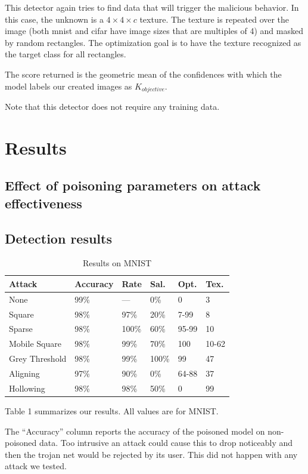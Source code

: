 \documentclass[letterpaper, 10 pt, conference]{ieeeconf}  %
\begin{document}
This detector again tries to find data that will trigger the malicious
behavior.  In this case, the unknown is a $4\times 4\times c$ texture.  The
texture is repeated over the image (both mnist and cifar have image
sizes that are multiples of 4) and masked by random rectangles.  The
optimization goal is to have the texture recognized as the target
class for all rectangles.

The score returned is the geometric mean of the confidences with which
the model labels our created images as $K_{objective}$.

Note that this detector does not require any training data.

\section{Results}


\subsection{Effect of poisoning parameters on attack effectiveness}


\subsection{Detection results}

\begin{table}
  \begin{tabularx}{0.48\textwidth}{llllll}
    \hline
    Attack & Accuracy & Rate & Sal. & Opt. & Tex.\\
    \hline
    None & 99\% & ---  & 0\% & 0 & 3\\
    Square & 98\% & 97\% & 20\% & 7-99 & 8\\
    Sparse & 98\% & 100\% & 60\% & 95-99 & 10\\
    Mobile Square & 98\% & 99\% & 70\% & 100 & 10-62\\
    Grey Threshold & 98\% & 99\% & 100\% & 99 & 47\\
    Aligning & 97\% & 90\% & 0\% & 64-88 & 37\\
    Hollowing & 98\% & 98\% & 50\% & 0 & 99\\
    \hline
  \end{tabularx}
  \caption{Results on MNIST}
\end{table}

Table 1 summarizes our results.  All values are for MNIST.

The ``Accuracy'' column reports the accuracy of the poisoned model on
non-poisoned data.  Too intrusive an attack could cause this to drop
noticeably and then the trojan net would be rejected by its user.
This did not happen with any attack we tested.
\end{document}
